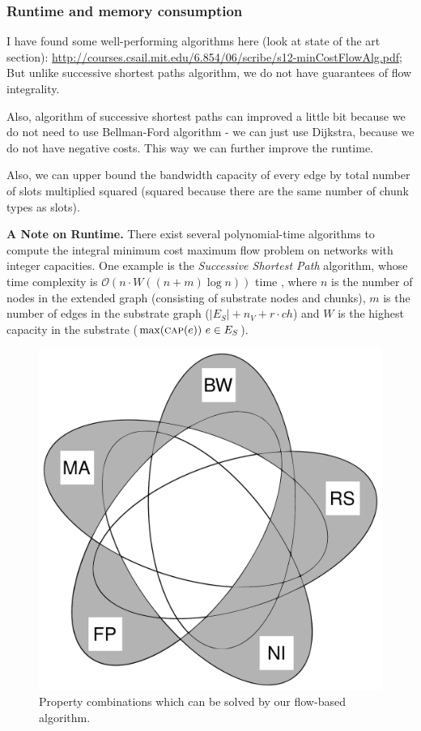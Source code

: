 \documentclass[9pt,twocolumn]{scrartcl}
\newcommand{\Capacity}{\ensuremath{\textsc{cap}}}
\newcommand{\RedundancyFactor}{\ensuremath{r}}
\newcommand{\SubstrateEdges}{\ensuremath{E_S}}
\newcommand{\SubstrateEdge}{\ensuremath{e}}
\newcommand{\Vms}{\ensuremath{n_V}}
\newcommand{\ChunkTypes}{\ensuremath{ch}}
\begin{document}
\subsubsection{Runtime and memory consumption}

I have found some well-performing algorithms here (look at state of the art section):
  \url{http://courses.csail.mit.edu/6.854/06/scribe/s12-minCostFlowAlg.pdf}; But unlike successive shortest paths algorithm, we do not have guarantees of flow integrality. 

Also, algorithm of successive shortest paths can improved a little bit because we do not need to use Bellman-Ford algorithm - we can just use Dijkstra, because we do not have negative costs. This way we can further improve the runtime.

Also, we can upper bound the bandwidth capacity of every edge by total number of slots multiplied squared (squared because there are the same number of chunk types as slots).


\textbf{A Note on Runtime.} There exist several polynomial-time algorithms to compute
the integral minimum cost maximum flow problem on networks with integer capacities.
One example is the \emph{Successive Shortest Path} algorithm,
whose time complexity is $\mathcal{O}(n \cdot W((n+m)\log n)
)$ time \cite{successive_shortest_path_complexity}, where $n$ is the number of
nodes in the extended graph (consisting of substrate nodes and chunks),
$m$ is the number of edges in the substrate graph ($|\SubstrateEdges| + \Vms + \RedundancyFactor
\cdot \ChunkTypes$) and $W$ is the highest capacity in the substrate
($\max(\Capacity(\SubstrateEdge))~\SubstrateEdge\in\SubstrateEdges$).

\begin{figure}
\includegraphics[width=\columnwidth]{figs/venn_flow.pdf}
\caption{Property combinations which can be solved by our flow-based algorithm.}
\label{fig:venn_flow}
\end{figure}
\end{document}
